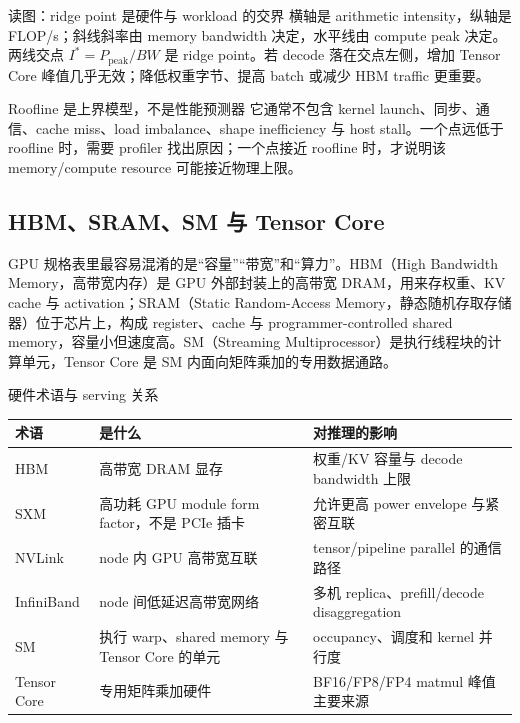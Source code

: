 \begin{knowledgebox}{读图：ridge point 是硬件与 workload 的交界}
横轴是 arithmetic intensity，纵轴是 FLOP/s；斜线斜率由 memory bandwidth 决定，水平线由 compute peak 决定。两线交点 $I^*=P_{\mathrm{peak}}/BW$ 是 ridge point。若 decode 落在交点左侧，增加 Tensor Core 峰值几乎无效；降低权重字节、提高 batch 或减少 HBM traffic 更重要。
\end{knowledgebox}

\begin{warningbox}{Roofline 是上界模型，不是性能预测器}
它通常不包含 kernel launch、同步、通信、cache miss、load imbalance、shape inefficiency 与 host stall。一个点远低于 roofline 时，需要 profiler 找出原因；一个点接近 roofline 时，才说明该 memory/compute resource 可能接近物理上限。
\end{warningbox}

\subsection{HBM、SRAM、SM 与 Tensor Core}

GPU 规格表里最容易混淆的是“容量”“带宽”和“算力”。HBM（High Bandwidth Memory，高带宽内存）是 GPU 外部封装上的高带宽 DRAM，用来存权重、KV cache 与 activation；SRAM（Static Random-Access Memory，静态随机存取存储器）位于芯片上，构成 register、cache 与 programmer-controlled shared memory，容量小但速度高。SM（Streaming Multiprocessor）是执行线程块的计算单元，Tensor Core 是 SM 内面向矩阵乘加的专用数据通路。


\begin{knowledgebox}{硬件术语与 serving 关系}
\begin{tabularx}{\textwidth}{L{2.4cm}YY}
\toprule
术语 & 是什么 & 对推理的影响 \\
\midrule
HBM & 高带宽 DRAM 显存 & 权重/KV 容量与 decode bandwidth 上限 \\
SXM & 高功耗 GPU module form factor，不是 PCIe 插卡 & 允许更高 power envelope 与紧密互联 \\
NVLink & node 内 GPU 高带宽互联 & tensor/pipeline parallel 的通信路径 \\
InfiniBand & node 间低延迟高带宽网络 & 多机 replica、prefill/decode disaggregation \\
SM & 执行 warp、shared memory 与 Tensor Core 的单元 & occupancy、调度和 kernel 并行度 \\
Tensor Core & 专用矩阵乘加硬件 & BF16/FP8/FP4 matmul 峰值主要来源 \\
\bottomrule
\end{tabularx}
\end{knowledgebox}

